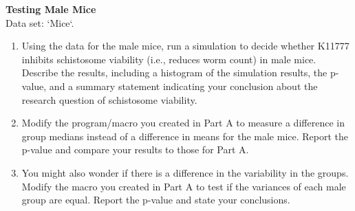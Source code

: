 \documentclass[
]{report}
\begin{document}
\begin{list}{E.}{ \setlength{\itemsep}{0.5em}}
  \item \textbf{Testing Male Mice} \\
  Data set: `Mice`. 
  \begin{enumerate}
    \setcounter{enumi}{0}  
    \item Using the data for the male mice, run a simulation to decide whether K11777 inhibits schistosome
viability (i.e., reduces worm count) in male mice. Describe the results, including a histogram
of the simulation results, the p-value, and a summary statement indicating your conclusion
about the research question of schistosome viability.
    \item Modify the program/macro you created in Part A to measure a difference in group medians
instead of a difference in means for the male mice. Report the p-value and compare your results
to those for Part A.
    \item You might also wonder if there is a difference in the variability in the groups. Modify the macro
you created in Part A to test if the variances of each male group are equal. Report the p-value and
state your conclusions.
  \end{enumerate}
  
  
  

\end{list}
\end{document}
